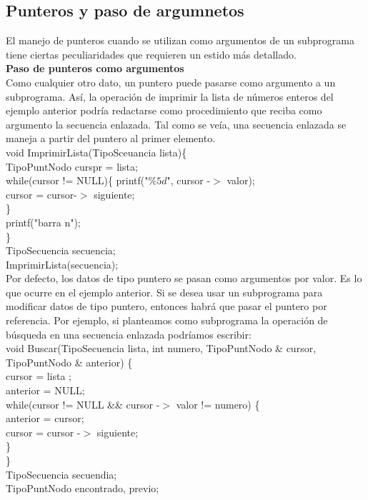 \documentclass[11pt,a4paper]{article}
\begin{document}
  \subsection{Punteros y paso de argumnetos}
  El manejo de punteros cuando se utilizan como argumentos de un subprograma tiene ciertas peculiaridades que requieren un estido más detallado.\\
  \textbf{Paso de punteros como argumentos}\\
  Como cualquier otro dato, un puntero puede pasarse como argumento a un
  subprograma. Así, la operación de imprimir la lista de números enteros del
  ejemplo anterior podría redactarse como procedimiento que reciba como argumento la secuencia enlazada. Tal como se veía, una secuencia enlazada se
  maneja a partir del puntero al primer elemento.\\
  void ImprimirLista(TipoSceuancia lista)\{\\
  TipoPuntNodo curspr = lista;\\
  while(cursor != NULL)\{
  printf("$\%5d$", cursor -$>$ valor); \\
  cursor = cursor-$>$ siguiente;\\
  \}\\
  printf("barra n");\\
  \}\\
  TipoSecuencia secuencia;\\
  ImprimirLista(secuencia);\\
  Por defecto, los datos de tipo puntero se pasan como argumentos por valor.
  Es lo que ocurre en el ejemplo anterior. Si se desea usar un subprograma
  para modificar datos de tipo puntero, entonces habrá que pasar el puntero
  por referencia. Por ejemplo, si planteamos como subprograma la operación de búsqueda en una secuencia enlazada podríamos escribir:\\
  void Buscar(TipoSecuencia lista, int numero, TipoPuntNodo \&  cursor, TipoPuntNodo \& anterior) \{ \\
  cursor = lista ;\\
  anterior = NULL;\\
  while(cursor != NULL \&\& cursor -$>$ valor != numero) \{\\
  anterior = cursor;\\
  cursor = cursor -$>$ siguiente;\\
  \}\\
  \}\\
  TipoSecuencia secuendia;\\
  TipoPuntNodo encontrado, previo;\\
\end{document}
